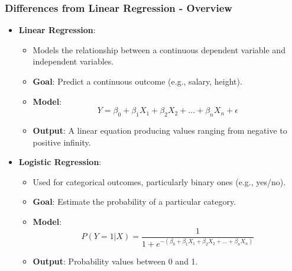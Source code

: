 \documentclass[aspectratio=169]{beamer}
\begin{document}
\begin{frame}[fragile]
    \frametitle{Differences from Linear Regression - Overview}
    
    \begin{itemize}
        \item \textbf{Linear Regression}:
            \begin{itemize}
                \item Models the relationship between a continuous dependent variable and independent variables.
                \item \textbf{Goal}: Predict a continuous outcome (e.g., salary, height).
                \item \textbf{Model}: 
                \[
                Y = \beta_0 + \beta_1X_1 + \beta_2X_2 + ... + \beta_nX_n + \epsilon
                \]
                \item \textbf{Output}: A linear equation producing values ranging from negative to positive infinity.
            \end{itemize}

        \item \textbf{Logistic Regression}:
            \begin{itemize}
                \item Used for categorical outcomes, particularly binary ones (e.g., yes/no).
                \item \textbf{Goal}: Estimate the probability of a particular category.
                \item \textbf{Model}:
                \[
                P(Y=1 | X) = \frac{1}{1 + e^{-(\beta_0 + \beta_1X_1 + \beta_2X_2 + ... + \beta_nX_n)}}
                \]
                \item \textbf{Output}: Probability values between 0 and 1.
            \end{itemize}
    \end{itemize}
\end{frame}
\end{document}
